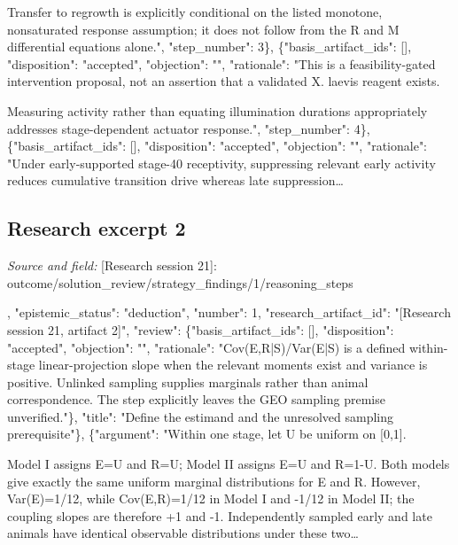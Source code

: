 \documentclass[11pt]{article}
\begin{document}
Transfer to regrowth is explicitly conditional on the listed monotone, nonsaturated response assumption; it does not follow from the R and M differential equations alone.", "step\_number": 3\}, \{"basis\_artifact\_ids": [], "disposition": "accepted", "objection": "", "rationale": "This is a feasibility-gated intervention proposal, not an assertion that a validated X. laevis reagent exists.

Measuring activity rather than equating illumination durations appropriately addresses stage-dependent actuator response.", "step\_number": 4\}, \{"basis\_artifact\_ids": [], "disposition": "accepted", "objection": "", "rationale": "Under early-supported stage-40 receptivity, suppressing relevant early activity reduces cumulative transition drive whereas late suppression\ldots{}

\subsection{Research excerpt 2}
\textit{Source and field: }[Research session 21]: outcome/solution\_review/strategy\_findings/1/reasoning\_steps\par
[\{"argument": "Let E\_i denote an animal's early wound-response measurement, R\_i its later epidermal RIC/ECM-transition measurement, and S\_i developmental stage. An animal-level coupling estimand is the within-stage slope Cov(E,R|S)/Var(E|S), when the variance is positive. Measurements from different animals at different times estimate marginal distributions, not this joint distribution. Whether the actual GEO samples provide animal linkage, independent animals, pools, or only technical/library replication remains unverified.

Pool-level results must not be represented as animal-level prediction.", "basis\_artifact\_ids": [], "epistemic\_status": "deduction", "number": 1, "research\_artifact\_id": "[Research session 21, artifact 2]", "review": \{"basis\_artifact\_ids": [], "disposition": "accepted", "objection": "", "rationale": "Cov(E,R|S)/Var(E|S) is a defined within-stage linear-projection slope when the relevant moments exist and variance is positive. Unlinked sampling supplies marginals rather than animal correspondence. The step explicitly leaves the GEO sampling premise unverified."\}, "title": "Define the estimand and the unresolved sampling prerequisite"\}, \{"argument": "Within one stage, let U be uniform on [0,1].

Model I assigns E=U and R=U; Model II assigns E=U and R=1-U. Both models give exactly the same uniform marginal distributions for E and R. However, Var(E)=1/12, while Cov(E,R)=1/12 in Model I and -1/12 in Model II; the coupling slopes are therefore +1 and -1. Independently sampled early and late animals have identical observable distributions under these two\ldots{}
\end{document}

